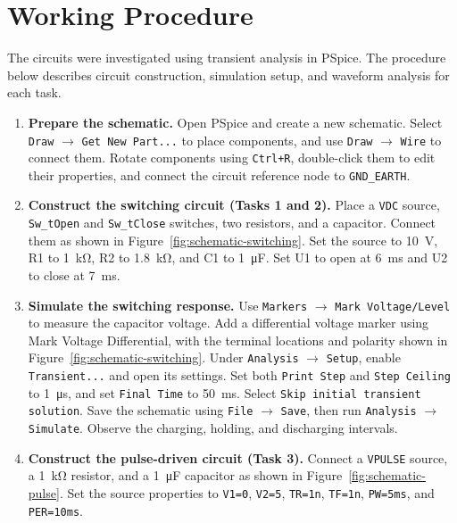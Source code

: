 \documentclass[12pt,a4paper]{article}
\begin{document}
	\section{Working Procedure}
	The circuits were investigated using transient analysis in PSpice.
	The procedure below describes circuit construction, simulation setup,
	and waveform analysis for each task.
	
	\begin{enumerate}[label=\arabic*., leftmargin=2.5em, itemsep=6pt]
		\item \textbf{Prepare the schematic.}
		Open PSpice and create a new schematic.  Select
		\texttt{Draw} $\rightarrow$ \texttt{Get New Part...} to place
		components, and use \texttt{Draw} $\rightarrow$ \texttt{Wire}
		to connect them.  Rotate components using \texttt{Ctrl+R},
		double-click them to edit their properties, and connect the
		circuit reference node to \texttt{GND\_EARTH}.
		
		\item \textbf{Construct the switching circuit (Tasks 1 and 2).}
		Place a \texttt{VDC} source, \texttt{Sw\_tOpen} and
		\texttt{Sw\_tClose} switches, two resistors, and a capacitor.
		Connect them as shown in Figure~\ref{fig:schematic-switching}.
		Set the source to \SI{10}{\volt}, R1 to \SI{1}{\kilo\ohm},
		R2 to \SI{1.8}{\kilo\ohm}, and C1 to
		\SI{1}{\micro\farad}.  Set U1 to open at
		\SI{6}{\milli\second} and U2 to close at
		\SI{7}{\milli\second}.
		
		\item \textbf{Simulate the switching response.}
		Use \texttt{Markers} $\rightarrow$ \texttt{Mark Voltage/Level}
		to measure the capacitor voltage.  Add a differential voltage
		marker using \textnormal{Mark Voltage Differential}, with the
		terminal locations and polarity shown in
		Figure~\ref{fig:schematic-switching}.  Under
		\texttt{Analysis} $\rightarrow$ \texttt{Setup}, enable
		\texttt{Transient...} and open its settings.  Set both
		\texttt{Print Step} and \texttt{Step Ceiling} to
		\SI{1}{\micro\second}, and set \texttt{Final Time} to
		\SI{50}{\milli\second}.  Select
		\texttt{Skip initial transient solution}.  Save the schematic
		using \texttt{File} $\rightarrow$ \texttt{Save}, then run
		\texttt{Analysis} $\rightarrow$ \texttt{Simulate}.
		Observe the charging, holding, and discharging intervals.
		
		\item \textbf{Construct the pulse-driven circuit (Task 3).}
		Connect a \texttt{VPULSE} source, a \SI{1}{\kilo\ohm}
		resistor, and a \SI{1}{\micro\farad} capacitor as shown in
		Figure~\ref{fig:schematic-pulse}.  Set the source properties to
		\texttt{V1=0}, \texttt{V2=5}, \texttt{TR=1n},
		\texttt{TF=1n}, \texttt{PW=5ms}, and \texttt{PER=10ms}.
		

\end{enumerate}
\end{document}

